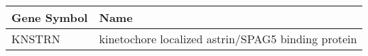 \begin{tabular}{ll}
\toprule
Gene Symbol &                                               Name \\
\midrule
     KNSTRN & kinetochore localized astrin/SPAG5 binding protein \\
\bottomrule
\end{tabular}

